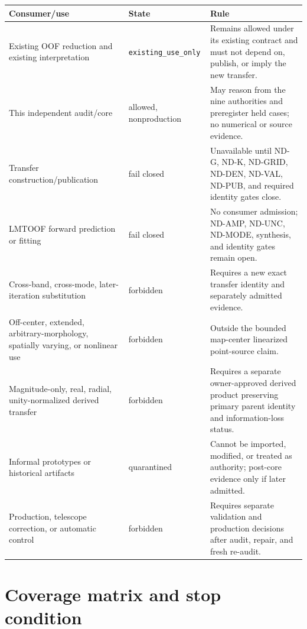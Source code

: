\documentclass[11pt]{article}
\begin{document}
\begin{longtable}{@{}L{0.24\textwidth}L{0.18\textwidth}L{0.49\textwidth}@{}}
\toprule
Consumer/use & State & Rule \\
\midrule
\endhead
Existing OOF reduction and existing interpretation &
\texttt{existing\_use\_only} & Remains allowed under its existing contract and
must not depend on, publish, or imply the new transfer. \\
This independent audit/core & allowed, nonproduction & May reason from the
nine authorities and preregister held cases; no numerical or source evidence. \\
Transfer construction/publication & fail closed & Unavailable until ND-G,
ND-K, ND-GRID, ND-DEN, ND-VAL, ND-PUB, and required identity gates close. \\
LMTOOF forward prediction or fitting & fail closed & No consumer admission;
ND-AMP, ND-UNC, ND-MODE, synthesis, and identity gates remain open. \\
Cross-band, cross-mode, later-iteration substitution & forbidden & Requires a
new exact transfer identity and separately admitted evidence. \\
Off-center, extended, arbitrary-morphology, spatially varying, or nonlinear
use & forbidden & Outside the bounded map-center linearized point-source claim. \\
Magnitude-only, real, radial, unity-normalized derived transfer & forbidden &
Requires a separate owner-approved derived product preserving primary parent
identity and information-loss status. \\
Informal prototypes or historical artifacts & quarantined & Cannot be imported,
modified, or treated as authority; post-core evidence only if later admitted. \\
Production, telescope correction, or automatic control & forbidden & Requires
separate validation and production decisions after audit, repair, and fresh
re-audit. \\
\bottomrule
\end{longtable}

\section{Coverage matrix and stop condition}
\end{document}

